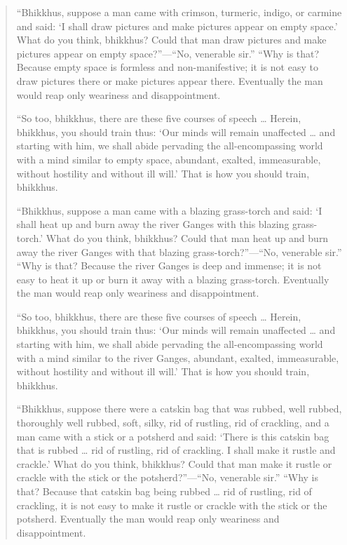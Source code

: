 \begin{quotation}
“Bhikkhus, suppose a man came with crimson, turmeric, indigo, or carmine
and said: ‘I shall draw pictures and make pictures appear on empty
space.’ What do you think, bhikkhus? Could that man draw pictures and
make pictures appear on empty space?”—“No, venerable sir.” “Why is that?
Because empty space is formless and non-manifestive; it is not easy to
draw pictures there or make pictures appear there. Eventually the man
would reap only weariness and disappointment.

“So too, bhikkhus, there are these five courses of speech \ldots{} Herein,
bhikkhus, you should train thus: ‘Our minds will remain unaffected \ldots{}
and starting with him, we shall abide pervading the all-encompassing
world with a mind similar to empty space, abundant, exalted,
immeasurable, without hostility and without ill will.’ That is how you
should train, bhikkhus.

“Bhikkhus, suppose a man came with a blazing grass-torch and said: ‘I
shall heat up and burn away the river Ganges with this blazing
grass-torch.’ What do you think, bhikkhus? Could that man heat up and
burn away the river Ganges with that blazing grass-torch?”—“No,
venerable sir.” “Why is that? Because the river Ganges is deep and
immense; it is not easy to heat it up or burn it away with a blazing
grass-torch. Eventually the man would reap only weariness and
disappointment.

“So too, bhikkhus, there are these five courses of speech \ldots{} Herein,
bhikkhus, you should train thus: ‘Our minds will remain unaffected \ldots{}
and starting with him, we shall abide pervading the all-encompassing
world with a mind similar to the river Ganges, abundant, exalted,
immeasurable, without hostility and without ill will.’ That is how you
should train, bhikkhus.

“Bhikkhus, suppose there were a catskin bag that was rubbed, well
rubbed, thoroughly well rubbed, soft, silky, rid of rustling, rid of
crackling, and a man came with a stick or a potsherd and said: ‘There is
this catskin bag that is rubbed \ldots{} rid of rustling, rid of crackling. I
shall make it rustle and crackle.’ What do you think, bhikkhus? Could
that man make it rustle or crackle with the stick or the potsherd?”—“No,
venerable sir.” “Why is that? Because that catskin bag being rubbed \ldots{}
rid of rustling, rid of crackling, it is not easy to make it rustle or
crackle with the stick or the potsherd. Eventually the man would reap
only weariness and disappointment.


\end{quotation}
